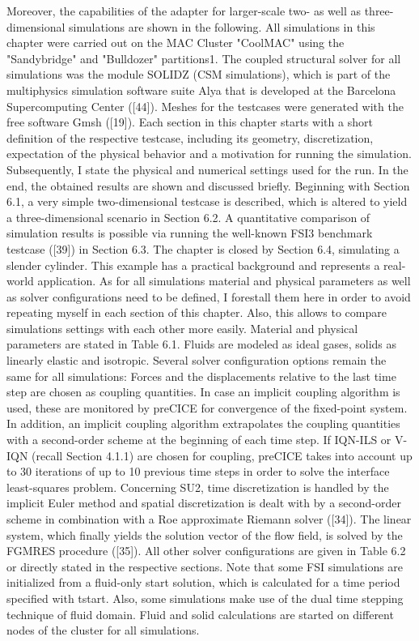  Moreover, the capabilities
of the adapter for larger-scale two- as well as three-dimensional simulations are shown in the following.
All simulations in this chapter were carried out on the MAC Cluster "CoolMAC" using the "Sandybridge"
and "Bulldozer" partitions1. The coupled structural solver for all simulations was the module SOLIDZ
(CSM simulations), which is part of the multiphysics simulation software suite Alya that is developed
at the Barcelona Supercomputing Center ([44]). Meshes for the testcases were generated with the free
software Gmsh ([19]).
Each section in this chapter starts with a short definition of the respective testcase, including its geometry,
discretization, expectation of the physical behavior and a motivation for running the simulation.
Subsequently, I state the physical and numerical settings used for the run. In the end, the obtained
results are shown and discussed briefly.
Beginning with Section 6.1, a very simple two-dimensional testcase is described, which is altered to yield a
three-dimensional scenario in Section 6.2. A quantitative comparison of simulation results is possible via
running the well-known FSI3 benchmark testcase ([39]) in Section 6.3. The chapter is closed by Section
6.4, simulating a slender cylinder. This example has a practical background and represents a real-world
application.
As for all simulations material and physical parameters as well as solver configurations need to be defined,
I forestall them here in order to avoid repeating myself in each section of this chapter. Also, this allows
to compare simulations settings with each other more easily. Material and physical parameters are stated
in Table 6.1. Fluids are modeled as ideal gases, solids as linearly elastic and isotropic.
Several solver configuration options remain the same for all simulations: Forces and the displacements
relative to the last time step are chosen as coupling quantities. In case an implicit coupling algorithm is
used, these are monitored by preCICE for convergence of the fixed-point system. In addition, an implicit
coupling algorithm extrapolates the coupling quantities with a second-order scheme at the beginning of
each time step. If IQN-ILS or V-IQN (recall Section 4.1.1) are chosen for coupling, preCICE takes into
account up to 30 iterations of up to 10 previous time steps in order to solve the interface least-squares
problem.
Concerning SU2, time discretization is handled by the implicit Euler method and spatial discretization is
dealt with by a second-order scheme in combination with a Roe approximate Riemann solver ([34]). The
linear system, which finally yields the solution vector of the flow field, is solved by the FGMRES procedure
([35]). All other solver configurations are given in Table 6.2 or directly stated in the respective sections.
Note that some FSI simulations are initialized from a fluid-only start solution, which is calculated for a
time period specified with tstart. Also, some simulations make use of the dual time stepping technique of
fluid domain.
Fluid and solid calculations are started on different nodes of the cluster for all simulations.



